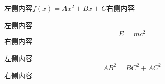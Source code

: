 \documentclass[UTF8]{ctexrep}
\begin{document}
\par
左侧内容$f(x)=Ax^2+Bx+C$右侧内容

\par
左侧内容$$E=mc^2$$右侧内容

\par
左侧内容\begin{equation}
    AB^2=BC^2+AC^2
\end{equation}右侧内容
\end{document}
